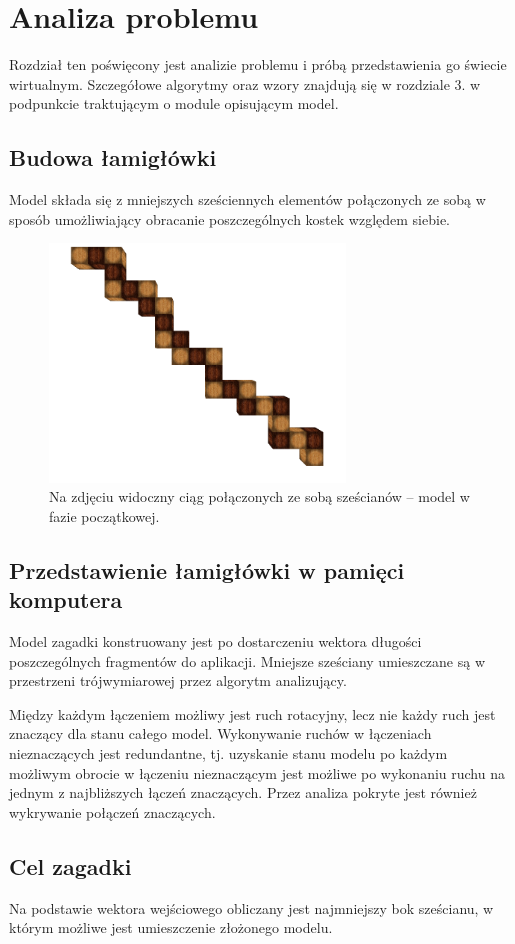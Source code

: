 \chapter{Analiza problemu}
\thispagestyle{chapterBeginStyle}
\label{rozdzial1}

Rozdział ten poświęcony jest analizie problemu i próbą przedstawienia go świecie wirtualnym. Szczegółowe algorytmy oraz wzory znajdują się w rozdziale 3. w podpunkcie traktującym o module opisującym model.

\section{Budowa łamigłówki}

Model składa się z mniejszych sześciennych elementów połączonych ze sobą w sposób umożliwiający obracanie poszczególnych kostek względem siebie.

\begin{figure}[h]
    \centering
    \includegraphics[width=0.7\textwidth]{start}
    \caption{Na zdjęciu widoczny ciąg połączonych ze sobą sześcianów – model w fazie początkowej.}
    \label{fig:joints1}
\end{figure}

\section{Przedstawienie łamigłówki w pamięci komputera}

Model zagadki konstruowany jest po dostarczeniu wektora długości poszczególnych fragmentów do aplikacji. Mniejsze sześciany umieszczane są w przestrzeni trójwymiarowej przez algorytm analizujący.

Między każdym łączeniem możliwy jest ruch rotacyjny, lecz nie każdy ruch jest znaczący dla stanu całego model. Wykonywanie ruchów w łączeniach nieznaczących jest redundantne, tj. uzyskanie stanu modelu po każdym możliwym obrocie w łączeniu nieznaczącym jest możliwe po wykonaniu ruchu na jednym z najbliższych łączeń znaczących. Przez analiza pokryte jest również wykrywanie połączeń znaczących.

\section{Cel zagadki}

Na podstawie wektora wejściowego obliczany jest najmniejszy bok sześcianu, w którym możliwe jest umieszczenie złożonego modelu. 
